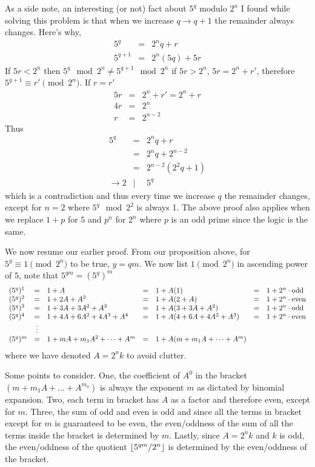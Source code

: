 \documentclass[aps,preprint,preprintnumbers,nofootinbib,showpacs,prd]{revtex4-1}
\newcommand{\nbea}{\begin{eqnarray*}}
\newcommand{\neea}{\end{eqnarray*}}
\DeclarePairedDelimiter{\floor}{\lfloor}{\rfloor}
\begin{document}
As a side note, an interesting (or not) fact about $5^q$ modulo $2^n$ I found while solving this problem is that when we increase $q \to q+1$ the remainder always changes. Here's why, 
%
\nbea
5^q & = & 2^n q + r \\
5^{q+1} & = & 2^n(5q) + 5r
\neea
%
If $5r < 2^n$ then $5^q \mod 2^n \neq 5^{q+1} \mod 2^n$ if $5r > 2^n$, $5r = 2^n + r'$, therefore $5^{q+1} \equiv r' \pmod{2^n}$. If $r = r'$
%
\nbea
5r & = & 2^n + r' = 2^n + r \\
4r & = & 2^n \\
r & = & 2^{n-2}
\neea
% 
Thus
%
\nbea
5^q & = & 2^n q + r \\
& = & 2^n q + 2^{n-2} \\
& = & 2^{n-2}(2^2q + 1) \\
\to 2 &|& 5^q
\neea
%
which is a contradiction and thus every time we increase $q$ the remainder changes, except for $n = 2$ where $5^q \mod 2^2$ is always 1. The above proof also applies when we replace $1+p$ for $5$ and $p^n$ for $2^n$ where $p$ is an odd prime since the logic is the same.

We now resume our earlier proof. From our proposition above, for $5^y \equiv 1 \pmod{2^n}$ to be true, $y = qm$. We now list $1 \pmod{2^n}$ in ascending power of $5$, note that $5^{qm} = (5^q)^m$
%
\nbea
\begin{array} {l c l c l c l}
(5^{q})^1 & = & 1 + A & = & 1 + A (1) & = & 1 + 2^n \cdot {\rm odd} \\
(5^{q})^2 & = & 1 + 2A + A^2 & = & 1 + A(2 + A) & = & 1 + 2^n \cdot {\rm even} \\
(5^{q})^3 & = & 1 + 3A + 3A^2 + A^3 & = & 1 + A(3 + 3A + A^2) & = & 1 + 2^n \cdot {\rm odd} \\
(5^{q})^4 & = & 1 + 4A + 6A^2 + 4A^3 + A^4 & = & 1 + A(4 + 6A + 4A^2 + A^3) & = & 1 + 2^n \cdot {\rm even} \\
& \vdots & & & & & \\
(5^{q})^m & = & 1 + mA + m_1A^2 + \dots + A^m & = & 1 + A(m + m_1A + \dots + A^m)
\end{array}
\neea
%
where we have denoted $A = 2^n k$ to avoid clutter. 

Some points to consider. One, the coefficient of $A^0$ in the bracket $(m + m_1A + \dots + A^{m_0})$ is always the exponent $m$ as dictated by binomial expansion. Two, each term in bracket has $A$ as a factor and therefore even, except for $m$. Three, the sum of odd and even is odd and since all the terms in bracket except for $m$ is guaranteed to be even, the even/oddness of the sum of all the terms inside the bracket is determined by $m$. Lastly, since $A=2^n k$ and $k$ is odd, the even/oddness of the quotient $\floor{5^{qm}/2^n}$ is determined by the even/oddness of the bracket.
\end{document}
